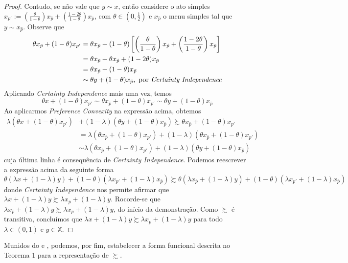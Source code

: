 \documentclass[11pt, a4paper]{article}
\theoremstyle{nonumberplain}
\newtheorem{proof}{Dem.}
\theoremstyle{plain}
\theoremstyle{plain}
\theoremstyle{plain}
\begin{document}
\begin{proof}
Contudo, se não vale que $y\sim x$, então considere o ato simples $x_{p'}:=\left(\frac{\theta}{1-\theta}\right)x_{\hat{p}}+\left(\frac{1-2\theta}{1-\theta}\right)x_{\bar{p}}$, com $\theta\in \left(0,\frac{1}{2}\right)$ e $x_{\hat{p}}$ o menu simples tal que $y\sim x_{\hat{p}}$. Observe que   
\begin{align*}
\theta x_{\bar{p}} + (1-\theta)x_{p'}&=\theta x_{\bar{p}} + (1-\theta)\left[ \left(\frac{\theta}{1-\theta}\right)x_{\hat{p}}+\left(\frac{1-2\theta}{1-\theta}\right)x_{\bar{p}}\right] \\ 
&=\theta x_{\bar{p}} + \theta x_{\hat{p}} + (1-2\theta)x_{\bar{p}} \\
&=\theta x_{\hat{p}} + (1-\theta)x_{\bar{p}} \\
&\sim \theta y + (1-\theta) x_{\bar{p}}, \text{ por \emph{Certainty Independence}}
\end{align*}
Aplicando \emph{Certainty Independence} mais uma vez, temos $$\theta x + (1-\theta)x_{p'}\sim \theta x_{\bar{p}} + (1-\theta)x_{p'}\sim \theta y + (1-\theta) x_{\bar{p}}$$
Ao aplicarmos \emph{Preference Convexity} na expressão acima, obtemos 
\begin{align*}
\lambda (\theta x + (1-\theta)x_{p'})&+(1-\lambda)(\theta y + (1-\theta) x_{\bar{p}}) \succsim \theta x_{\bar{p}} + (1-\theta)x_{p'}\\
&= \lambda (\theta x_{\bar{p}} + (1-\theta)x_{p'}) + (1-\lambda)(\theta x_{\bar{p}} + (1-\theta)x_{p'})\\
&\sim \lambda(\theta x_{\bar{p}} + (1-\theta)x_{p'})+(1-\lambda)(\theta y + (1-\theta) x_{\bar{p}})
\end{align*}
cuja última linha é consequência de \emph{Certainty Independence}. Podemos reescrever a expressão acima da seguinte forma
$$ \theta (\lambda x + (1-\lambda)y)+(1-\theta)(\lambda x_{p'}+(1-\lambda)x_{\bar{p}}) \succsim \theta (\lambda x_{\bar{p}} + (1-\lambda)y)+(1-\theta)(\lambda x_{p'}+(1-\lambda)x_{\bar{p}})$$
donde \emph{Certainty Independence} nos permite afirmar que $\lambda x + (1-\lambda)y\succsim \lambda x_{\bar{p}} + (1-\lambda)y$. Rocorde-se que $\lambda x_{\bar{p}} + (1-\lambda)y\succsim \lambda x_p + (1-\lambda)y$, do início da demonstração. Como $\succsim$ é transitiva, concluímos que $\lambda x + (1-\lambda)y\succsim \lambda x_p + (1-\lambda)y$ para todo $\lambda \in (0,1)$ e $y\in \mathbb{X}$.
\end{proof}
Munidos do  e , podemos, por fim, estabelecer a forma funcional descrita no Teorema 1 para a representação de $\succsim$. \\
\end{document}
